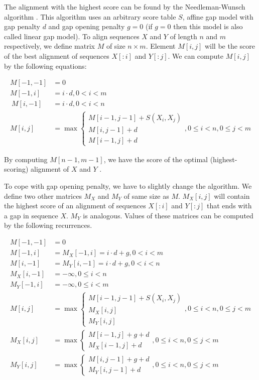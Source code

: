 The
alignment with the highest score can be found by the Needleman-Wunsch algorithm \cite{Durbin1998}.
This algorithm uses an arbitrary score table $S$, affine gap model with gap penalty
$d$ and gap opening penalty $g=0$ (if $g=0$ then this model is also called
linear gap model). To align sequences $X$ and $Y$ of length $n$ and $m$
respectively, we define matrix $M$ of size $n\times m$. Element $M[i,j]$ will be the
score of the best alignment of sequences $X[:i]$ and $Y[:j]$. We can compute
$M[i,j]$ by the following equations:

\begin{align} 
M[-1,-1] &= 0\\
M[-1,i] &= i\cdot d, 0< i < m\\\
M[i,-1] &= i\cdot d, 0< i < n\\
M[i,j] &= \max
\begin{cases}
 M[i-1,j-1]+S(X_i,X_j)\\M[i,j-1]+d\\
 M[i-1,j]+d
\end{cases}, 0\leq i<n,0\leq j<m \label{ALIGN:ALGO:AFFINE}
\end{align}

By computing $M[n-1,m-1]$, we have the score of the optimal (highest-scoring) alignment of $X$ and $Y$ \cite{Durbin1998}. 

To cope with gap opening penalty, we have to slightly change the algorithm.
We define two other matrices $M_X$ and $M_Y$ of same size as $M$. $M_X[i,j]$
will contain the highest score of an alignment of sequences $X[:i]$ and $Y[:j]$
that ends
with a gap in sequence $X$. $M_Y$ is analogous. Values of these matrices can be computed by the following recurrences.

\begin{align}
M[-1,-1] &= 0\\
M[-1,i] &= M_X[-1,i] = i\cdot d+g, 0 < i < m\\
M[i,-1] &= M_Y[i,-1] = i\cdot d+g, 0 < i < n\\
M_X[i,-1] &= -\infty, 0\leq i< n\\
M_Y[-1,i] &= -\infty, 0 \leq i< m\\
M[i,j] &= \max
\begin{cases}\label{ALIGN:ALGO:REALAFFINESTART}
 M[i-1,j-1]+S(X_i,X_j)\\
 M_X[i,j]\\
 M_Y[i,j]
\end{cases}, 0\leq i<n,0\leq j<m\\
M_X[i,j] &= \max
\begin{cases}
M[i-1,j]+g+d\\
M_X[i-1,j]+d
\end{cases}, 0\leq i<n,0\leq j<m\\
M_Y[i,j] &= \max
\begin{cases}
M[i,j-1]+g+d\\
M_Y[i,j-1]+d
\end{cases}, 0\leq i<n,0\leq j<m\label{ALIGN:ALGO:REALAFFINEEND}
\end{align}

